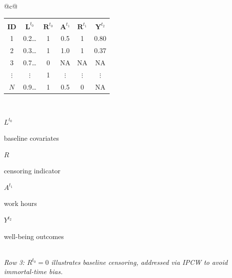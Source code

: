 \documentclass[border=8pt]{standalone}
\begin{document}
\huge
\renewcommand{\arraystretch}{1.5}
\setlength{\tabcolsep}{36pt}
\begin{tabular}{@{}c@{}}
\begin{tabular}{
   c
   >{\columncolor{covblue!30}}c
   >{\columncolor{censgrey!40}}c
   >{\columncolor{expamber!45}}c
   >{\columncolor{censgrey!40}}c
   >{\columncolor{outred!30}}c
}
\toprule
 &
\multicolumn{2}{c}{\textbf{T\textsubscript{0} (baseline)}} &
\multicolumn{2}{c}{\textbf{T\textsubscript{1} (exposure)}} &
\multicolumn{1}{c}{\textbf{T\textsubscript{2} (outcomes)}} \\
\cmidrule(lr){2-3} \cmidrule(lr){4-5} \cmidrule(lr){6-6}
\textbf{ID} &
$\boldsymbol{L}^{t_0}$ &
$\boldsymbol{R}^{t_0}$ &
$\boldsymbol{A}^{t_1}$ &
$\boldsymbol{R}^{t_1}$ &
$\boldsymbol{Y}^{t_2}$ \\
\midrule
1        & 0.2\;\ldots\;0.8 & 1 & 0.5      & 1        & 0.80 \\
2        & 0.3\;\ldots\;0.5 & 1 & 1.0      & 1        & 0.37 \\
3        & 0.7\;\ldots\;0.4 & 0 & NA       & NA       & NA \\
$\vdots$ & $\vdots$         & 1 & $\vdots$ & $\vdots$ & $\vdots$ \\
$N$      & 0.9\;\ldots\;1.1 & 1 & 0.5      & 0        & NA \\
\bottomrule
\end{tabular} \\[10pt]
{\Large
\colorbox{covblue!30}{\strut\;$L^{t_0}$\;} baseline covariates\quad
\colorbox{censgrey!40}{\strut\;$R$\;} censoring indicator\quad
\colorbox{expamber!45}{\strut\;$A^{t_1}$\;} work hours\quad
\colorbox{outred!30}{\strut\;$Y^{t_2}$\;} well-being outcomes
} \\[6pt]
{\large\itshape
Row 3: $R^{t_0}\!=\!0$ illustrates baseline censoring, addressed via IPCW to avoid immortal-time bias.
}
\end{tabular}
\end{document}
